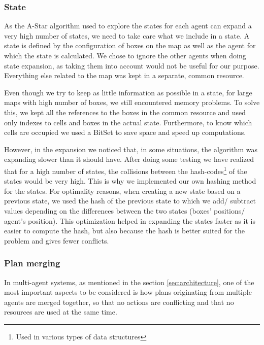 \subsubsection{State}
As the A-Star algorithm used to explore the states for each agent can expand a very high number of states, we
need to take care what we include in a state. A state is defined by the configuration of boxes on the map as
well as the agent for which the state is calculated. We chose to ignore the other agents when doing state
expansion, as taking them into account would not be useful for our purpose. Everything else related to the map
was kept in a separate, common resource.

Even though we try to keep as little information as possible in a state, for large maps with high number of
boxes, we still encountered memory problems. To solve this, we kept all the references to the boxes in the
common resource and used only indexes to cells and boxes in the actual state. Furthermore, to know which cells
are occupied we used a BitSet to save space and speed up computations.

However, in the expansion we noticed that, in some situations, the algorithm was expanding slower than it
should have. After doing some testing we have realized that for a high number of states, the collisions
between the hash-codes\footnote{Used in various types of data structures} of the states would be very high.
This is why we implemented our own hashing method for the states. For optimality reasons, when creating a new
state based on a previous state, we used the hash of the previous state to which we add/ subtract values
depending on the differences between the two states (boxes' positions/ agent's position). This optimization
helped in expanding the states faster as it is easier to compute the hash, but also because the hash is better
suited for the problem and gives fewer conflicts.

\newpage %
\subsubsection{Plan merging}
\label{sec:plan_merging}

In multi-agent systems, as mentioned in the section \ref{sec:architecture}, one of the most important aspects
to be considered is how plans originating from multiple agents are merged together, so that no actions are
conflicting and that no resources are used at the same time.

